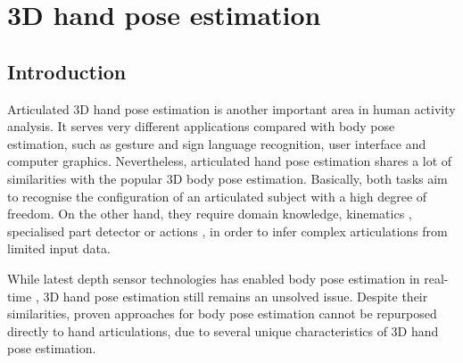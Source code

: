 \chapter{3D hand pose estimation}
\label{chap/hand}

\section{Introduction}

Articulated 3D hand pose estimation is another important area in human activity analysis. 
It serves very different applications compared with body pose estimation, such as gesture and sign language recognition, user interface and computer graphics.
Nevertheless, articulated hand pose estimation shares a lot of similarities with the popular 3D body pose estimation. Basically, both tasks aim to recognise the configuration of an articulated subject with a high degree of freedom. On the other hand, they require domain knowledge, \eg kinematics \cite{LaGorce2011, Simo-Serra2012}, specialised part detector \cite{Bissacco2007} or actions \cite{Yao2012}, in order to infer complex articulations from limited input data. 

While latest depth sensor technologies has enabled body pose estimation in real-time \cite{Baak2011, Shotton2011, Girshick2011, Sun2012}, 3D hand pose estimation still remains an unsolved issue. Despite their similarities, proven approaches for body pose estimation cannot be repurposed directly to hand articulations, due to several unique characteristics of 3D hand pose estimation.  

